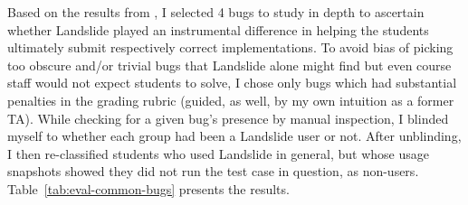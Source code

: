 Based on the results from \sect{\ref{sec:education-eval-bugfinding}},
I selected 4 bugs to study in depth to ascertain
whether Landslide played an instrumental difference
in helping the students ultimately submit respectively correct implementations.
To avoid bias of picking too obscure and/or trivial bugs
that Landslide alone might find but even course staff would not expect students to solve,
I chose only bugs which had substantial penalties in the grading rubric
(guided, as well, by my own intuition as a former TA).
While checking for a given bug's presence by manual inspection,
I blinded myself to whether each group had been a Landslide user or not.
After unblinding, I then re-classified students who used Landslide in general,
but whose usage snapshots showed they did not run the test case in question,
as non-users.
Table~\ref{tab:eval-common-bugs} presents the results.

